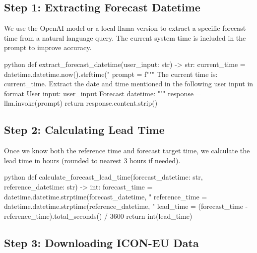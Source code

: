 %
\subsection*{Step 1: Extracting Forecast Datetime}

We use the OpenAI model or a local llama version to extract a specific forecast time from a natural language query. The current system time is included in the prompt to improve accuracy.

\begin{codeonly}{python}
def extract_forecast_datetime(user_input: str) -> str:
	current_time = datetime.datetime.now().strftime("%
	prompt = f"""
	The current time is: {current_time}.
	Extract the date and time mentioned in the following user input 
	in format %
	User input: {user_input}
	Forecast datetime:
	"""
	response = llm.invoke(prompt)
	return response.content.strip()
\end{codeonly}

%
\subsection*{Step 2: Calculating Lead Time}

Once we know both the reference time and forecast target time, we calculate the lead time in hours (rounded to nearest 3 hours if needed).

\begin{codeonly}{python}
def calculate_forecast_lead_time(forecast_datetime: str, reference_datetime: str) -> int:
	forecast_time = datetime.datetime.strptime(forecast_datetime, "%
	reference_time = datetime.datetime.strptime(reference_datetime, "%
	lead_time = (forecast_time - reference_time).total_seconds() / 3600
	return int(lead_time)
\end{codeonly}

%
\subsection*{Step 3: Downloading ICON-EU Data}

